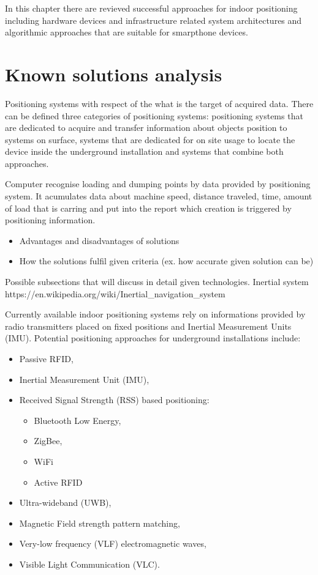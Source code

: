 \documentclass[../main.tex]{subfiles}
\begin{document}
In this chapter there are revieved successful approaches for indoor positioning including hardware devices and infrastructure related system architectures and algorithmic approaches that are suitable for smarpthone devices.

\section{Known solutions analysis}


Positioning systems with respect of the what is the target of acquired data. There can be defined three categories of positioning systems: positioning systems that are dedicated to acquire and transfer information about objects position to systems on surface, systems that are dedicated for on site usage to locate the device inside the underground installation and systems that combine both approaches.


Computer recognise loading and dumping points by data provided by positioning system. It acumulates data about machine speed, distance traveled, time, amount of load that is carring and put into the report which creation is triggered by positioning information.


\begin{itemize}
	\item Advantages and disadvantages of solutions
	\item How the solutions fulfil given criteria (ex. how accurate given solution can be)
\end{itemize}

Possible subsections that will discuss in detail given technologies.
Inertial system
https://en.wikipedia.org/wiki/Inertial_navigation_system

Currently available indoor positioning systems rely on informations provided by radio transmitters placed on fixed positions and Inertial Measurement Units (IMU). Potential positioning approaches for underground installations\cite{positioning_tests} include:
\begin{itemize}
	\item Passive RFID,
	\item Inertial Measurement Unit (IMU),
	\item Received Signal Strength (RSS) based positioning:
	\begin{itemize}
		\item Bluetooth Low Energy,
		\item ZigBee,
		\item WiFi
		\item Active RFID
	\end{itemize}
	\item Ultra-wideband (UWB),
	\item Magnetic Field strength pattern matching,
	\item Very-low frequency (VLF) electromagnetic waves,
	\item Visible Light Communication (VLC).
\end{itemize}
\end{document}
